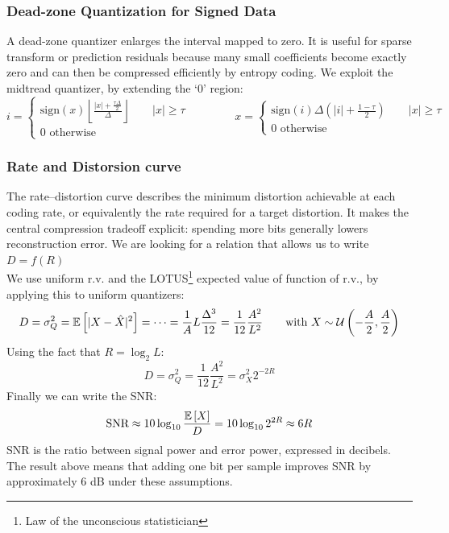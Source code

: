 \subsubsection{Dead-zone Quantization for Signed Data}
A dead-zone quantizer enlarges the interval mapped to zero. It is useful for sparse transform or prediction residuals because many small coefficients become exactly zero and can then be compressed efficiently by entropy coding.
We exploit the midtread quantizer, by extending the `0' region:
$$i = \begin{cases}
    \text{sign}(x)\left\lfloor\frac{|x| + \frac{\tau\Delta}{2}}{\Delta}\right\rfloor \qquad |x| \geq \tau\\
    0 \text{ otherwise}
\end{cases} \qquad \qquad x = \begin{cases}
    \text{sign}(i)\Delta\left(|i| + \frac{1-\tau}{2}\right)\qquad |x| \geq \tau\\
    0 \text{ otherwise}
\end{cases}$$
\subsubsection{Rate and Distorsion curve}
The rate--distortion curve describes the minimum distortion achievable at each coding rate, or equivalently the rate required for a target distortion. It makes the central compression tradeoff explicit: spending more bits generally lowers reconstruction error.
We are looking for a relation that allows us to write $D = f(R)$\\
We use uniform r.v. and the LOTUS\footnote{Law of the unconscious statistician} expected value of function of r.v., by applying this to uniform quantizers:
$$D = \sigma_Q^2 = \mathbb{E}\left[|X - \hat{X}|^2\right] = \cdots = \frac{1}{A}L\frac{\Delta^3}{12} = \frac{1}{12}\frac{A^2}{L^2} \qquad \text{with }X \sim \mathcal{U}\left(-\frac{A}{2},\frac{A}{2}\right)$$
Using the fact that $R = \log_2L$:
$$D = \sigma_Q^2  = \frac{1}{12}\frac{A^2}{L^2} = \sigma_X^2 2^{-2R}$$
Finally we can write the SNR:
$$\text{SNR} \approx10\log_{10}\frac{\mathbb{E}\left[X\right]}{D} = 10\log_{10} 2^{2R} \approx 6R$$
SNR is the ratio between signal power and error power, expressed in decibels. The result above means that adding one bit per sample improves SNR by approximately $6$ dB under these assumptions.
